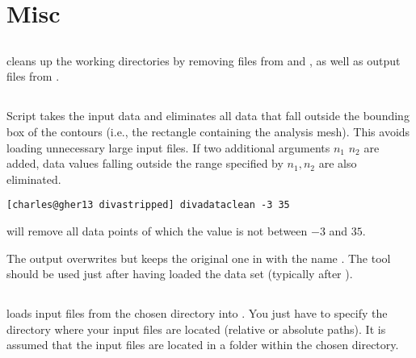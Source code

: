 \section{Misc}

\subsection{}

 cleans up the working directories by removing  files from  and , as well as output files from .

\subsection{}

Script  takes the input data  and eliminates all data that fall outside the bounding box of the contours (i.e., the rectangle containing the analysis mesh). This avoids loading unnecessary large input files. If two additional arguments $n_{1}$ $n_{2}$ are added, data values falling outside the range specified by $n_{1},n_{2}$ are also eliminated.

\example
\begin{lstlisting}[style=Bash]
[charles@gher13 divastripped] divadataclean -3 35
\end{lstlisting}
will remove all data points of which the value is not between $-3$ and $35$.

The output overwrites  but keeps the original one in  with the name . The tool should be used just after having loaded the data set (typically after ).

\subsection{\label{sec:divaload}}

 loads input files from the chosen directory into . You just have to specify the directory where your input files are located (relative or absolute paths). It is assumed that the input files are located in a folder  within the chosen directory.

